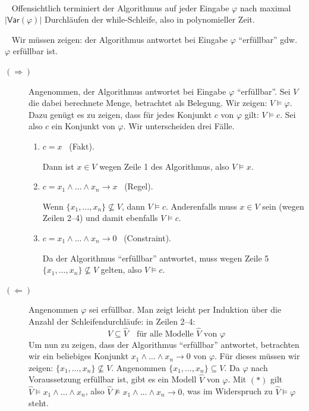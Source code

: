 \documentclass[fontsize=11pt, twoside=false, numbers=autoenddot]{scrbook}
\begin{document}
\par\noindent
\begin{beweis}
  ~\par
  ~
  Offensichtlich terminiert der Algorithmus auf jeder Eingabe $\varphi$
  nach maximal $|\textsf{Var}(\varphi)|$ Durchläufen der while-Schleife,
  also in polynomieller Zeit.

  \par\medskip
  ~
  Wir müssen zeigen:
  der Algorithmus antwortet bei Eingabe $\varphi$ "`erfüllbar"' gdw.\ $\varphi$ erfüllbar ist.
  \begin{description}
    \item[$(\Rightarrow)$]
      Angenommen, der Algorithmus antwortet bei Eingabe $\varphi$ "`erfüllbar"'.
      Sei $V$ die dabei berechnete Menge, betrachtet als Belegung.
      Wir zeigen: $V \models \varphi$.
      Dazu genügt es zu zeigen, dass für jedes Konjunkt $c$ von $\varphi$ gilt: $V \models c$.
      Sei also $c$ ein Konjunkt von $\varphi$. Wir unterscheiden drei Fälle.
      \begin{enumerate}
        \item
          $c = x$~ (Fakt).
          \par
          Dann ist $x \in V$ wegen Zeile 1 des Algorithmus, also $V \models x$.
        \item
          $c = x_1 \land \dots \land x_n \to x$~ (Regel).
          \par
          Wenn $\{x_1,\dots,x_n\} \nsubseteq V$,
          dann $V \models c$.
          Anderenfalls muss $x \in V$ sein (wegen Zeilen 2--4)
          und damit ebenfalls $V \models c$.
        \item
          $c = x_1 \land \dots \land x_n \to 0$~ (Constraint).
          \par
          Da der Algorithmus "`erfüllbar"' antwortet,
          muss wegen Zeile 5 $\{x_1,\dots,x_n\} \nsubseteq V$ gelten,
          also $V \models c$.
      \end{enumerate}
    \item[$(\Leftarrow)$]
      Angenommen $\varphi$ sei erfüllbar.
      Man zeigt leicht per Induktion über die Anzahl der Schleifendurchläufe:
      in Zeilen 2--4:
      \begin{equation*}
        \tag{$*$}
        V \subseteq \hat V \quad \text{für alle Modelle $\hat V$ von $\varphi$}
      \end{equation*}
      Um nun zu zeigen, dass der Algorithmus "`erfüllbar"' antwortet,
      betrachten wir ein beliebiges Konjunkt $x_1 \land \dots \land x_n \to 0$ von $\varphi$.
      Für dieses müssen wir zeigen: $\{x_1,\dots,x_n\} \nsubseteq V$.
      Angenommen $\{x_1,\dots,x_n\} \subseteq V$.
      Da $\varphi$ nach Voraussetzung erfüllbar ist,
      gibt es ein Modell $\hat V$ von $\varphi$.
      Mit $(*)$ gilt $\hat V \models x_1 \land \dots \land x_n$,
      also $\hat V \not\models x_1 \land \dots \land x_n \to 0$,
      was im Widerspruch zu $\hat V \models \varphi$ steht.\qedhere
  \end{description}
\end{beweis}%
\end{document}
